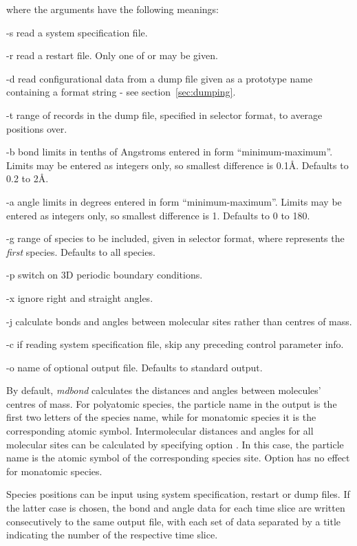 \documentclass[a4paper,twoside]{report}
\begin{document}
where the arguments have the following meanings:
\begin{Argdescription}
\item[-s] read a system specification file.
\item[-r] read a restart file. Only one of  or  may be given.
\item[-d] read configurational data from a dump file given as a prototype name
  containing a  format string - see section~\ref{sec:dumping}. 
\item[-t] range of records in the dump file, specified in selector
  format, to average positions over.
\item[-b] bond limits in tenths of Angstroms entered in form
  ``minimum-maximum''. Limits may be entered as integers only, so
  smallest difference is 0.1{\AA}. Defaults to 0.2 to 2{\AA}.
\item[-a] angle limits in degrees entered in form ``minimum-maximum''.
  Limits may be entered as integers only, so smallest difference is
  1{\textdegree}. Defaults to 0 to 180{\textdegree}.
\item[-g] range of species to be included, given in selector format,
  where  represents the \emph{first} species. Defaults to all species.
\item[-p] switch on 3D periodic boundary conditions.
\item[-x] ignore right and straight angles.
\item[-j] calculate bonds and angles between molecular sites rather than centres of mass.
\item[-c] if reading system specification file, skip any preceding
  control parameter info.
\item[-o] name of optional output file. Defaults to standard output.
\end{Argdescription}


By default, \emph{mdbond} calculates the distances and angles between molecules' centres of mass.
 For polyatomic species, the particle name in the output is the first two letters
 of the species name, while for monatomic species it is the corresponding atomic symbol. 
Intermolecular distances and angles for all molecular sites
 can be calculated by specifying option .
 In this case, the particle name is the atomic symbol
of the corresponding species site. Option  has no effect for monatomic species.

Species positions can be input using system specification, restart or dump
files. If the latter case is chosen, the bond and angle data for each time
slice are written consecutively to the same output file, with each set of
data separated by a title indicating the number of the respective time
slice.
\end{document}
